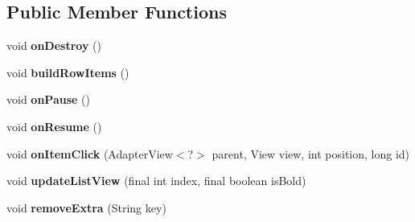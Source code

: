 \subsection*{Public Member Functions}
\begin{DoxyCompactItemize}
\item 
void {\bfseries on\+Destroy} ()\hypertarget{classcom_1_1example_1_1sebastian_1_1tindertp_1_1ChatListActivity_a8608df8543079b61d2603ff3c9ceed61}{}\label{classcom_1_1example_1_1sebastian_1_1tindertp_1_1ChatListActivity_a8608df8543079b61d2603ff3c9ceed61}

\item 
void {\bfseries build\+Row\+Items} ()\hypertarget{classcom_1_1example_1_1sebastian_1_1tindertp_1_1ChatListActivity_afe504e3c7bcb0c9cafcab54c15e089ad}{}\label{classcom_1_1example_1_1sebastian_1_1tindertp_1_1ChatListActivity_afe504e3c7bcb0c9cafcab54c15e089ad}

\item 
void {\bfseries on\+Pause} ()\hypertarget{classcom_1_1example_1_1sebastian_1_1tindertp_1_1ChatListActivity_aa895d489fd054489fc2d906e85dcf854}{}\label{classcom_1_1example_1_1sebastian_1_1tindertp_1_1ChatListActivity_aa895d489fd054489fc2d906e85dcf854}

\item 
void {\bfseries on\+Resume} ()\hypertarget{classcom_1_1example_1_1sebastian_1_1tindertp_1_1ChatListActivity_ad1ecd395258d9109c64c92613a5762ab}{}\label{classcom_1_1example_1_1sebastian_1_1tindertp_1_1ChatListActivity_ad1ecd395258d9109c64c92613a5762ab}

\item 
void {\bfseries on\+Item\+Click} (Adapter\+View$<$?$>$ parent, View view, int position, long id)\hypertarget{classcom_1_1example_1_1sebastian_1_1tindertp_1_1ChatListActivity_a8e8ef25c30fcbe13f691da38f4217e28}{}\label{classcom_1_1example_1_1sebastian_1_1tindertp_1_1ChatListActivity_a8e8ef25c30fcbe13f691da38f4217e28}

\item 
void {\bfseries update\+List\+View} (final int index, final boolean is\+Bold)\hypertarget{classcom_1_1example_1_1sebastian_1_1tindertp_1_1ChatListActivity_a8de4034f203ac8941f3073f1b28d87be}{}\label{classcom_1_1example_1_1sebastian_1_1tindertp_1_1ChatListActivity_a8de4034f203ac8941f3073f1b28d87be}

\item 
void {\bfseries remove\+Extra} (String key)\hypertarget{classcom_1_1example_1_1sebastian_1_1tindertp_1_1ChatListActivity_a702b1383d3ef0de52b244558f34a3da9}{}\label{classcom_1_1example_1_1sebastian_1_1tindertp_1_1ChatListActivity_a702b1383d3ef0de52b244558f34a3da9}


\end{DoxyCompactItemize}
